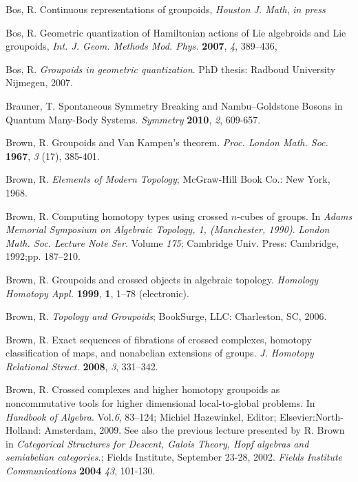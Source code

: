 \documentclass[12pt]{article}
\theoremstyle{plain}
\theoremstyle{definition}
\numberwithin{equation}{section}
\begin{document}
\begin{thebibliography}{199}
Bos, R.  Continuous representations of groupoids, \emph{Houston J. Math}, {\em in press}


Bos, R.  Geometric quantization of Hamiltonian actions of Lie algebroids and Lie groupoids, \textit{Int. J. Geom. Methods Mod. Phys.}  {\bf 2007}, {\em 4}, 389--436, 


Bos, R.  {\em Groupoids in geometric quantization}. PhD thesis: Radboud University Nijmegen, 2007.

Brauner, T. Spontaneous Symmetry Breaking and Nambu--Goldstone Bosons in Quantum Many-Body Systems. {\em Symmetry}  {\bf 2010}, {\em 2}, 609-657.

Brown, R.  Groupoids and Van Kampen's theorem. {\em Proc. London Math. Soc.} {\bf 1967}, {\em 3} (17), 385-401.

Brown, R. {\em Elements of {M}odern {T}opology}; McGraw-Hill Book Co.: New York, 1968.

Brown, R. Computing homotopy types using crossed $n$-cubes of  groups. In {\em Adams Memorial Symposium on Algebraic Topology, 1,  (Manchester, 1990)}. 
{\em London Math. Soc. Lecture Note Ser.} Volume {\em 175}; Cambridge Univ. Press: Cambridge, 1992;pp. 187--210.

Brown, R. Groupoids and crossed objects in algebraic topology.  \emph{Homology Homotopy Appl.} {\bf 1999}, \textbf{1}, 1--78 (electronic).

Brown, R.  {\em Topology and Groupoids}; BookSurge, LLC: Charleston, SC, 2006.

Brown, R.  Exact sequences of fibrations of crossed complexes, homotopy classif\/ication of maps, and nonabelian extensions of groups. \textit{J. Homotopy Relational Struct.}
{\bf 2008}, {\em 3}, 331--342.

Brown, R. Crossed complexes and higher homotopy groupoids as noncommutative tools for higher dimensional local-to-global problems. In {\em Handbook of Algebra}. Vol.{\em 6}, 83--124;
Michiel Hazewinkel, Editor; Elsevier:North-Holland: Amsterdam, 2009.  See also the previous lecture presented by R. Brown in {\em Categorical Structures for Descent, Galois Theory, Hopf algebras and semiabelian categories.}; Fields Institute, September 23-28, 2002. {\em Fields Institute Communications}  {\bf 2004}  {\em 43}, 101-130.


\end{thebibliography}
\end{document}
